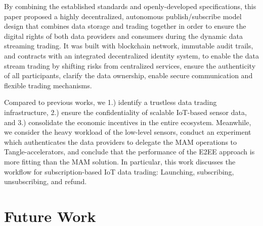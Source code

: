 \begin{spacing}{2.0}

By combining the established standards and openly-developed specifications, this paper proposed a highly decentralized, autonomous publish/subscribe model design that combines data storage and trading together in order to ensure the digital rights of both data providers and consumers during the dynamic data streaming trading. It was built with blockchain network, immutable audit trails, and contracts with an integrated decentralized identity system, to enable the data stream trading by shifting risks from centralized services, ensure the authenticity of all participants, clarify the data ownership, enable secure communication and flexible trading mechanisms.

Compared to previous works, we 1.) identify a trustless data trading infrastructure, 2.) ensure the confidentiality of scalable IoT-based sensor data, and 3.) consolidate the economic incentives in the entire ecosystem. Meanwhile, we consider the heavy workload of the low-level sensors, conduct an experiment which authenticates the data providers to delegate the MAM operations to Tangle-accelerators, and conclude that the performance of the E2EE approach is more fitting than the MAM solution. In particular, this work discusses the workflow for subscription-based IoT data trading: Launching, subscribing, unsubscribing, and refund.

\end{spacing}

\clearpage
{}

\newpage
{}
\chapter{Future Work}
\label{section:future_work}
\pagestyle{plain}


